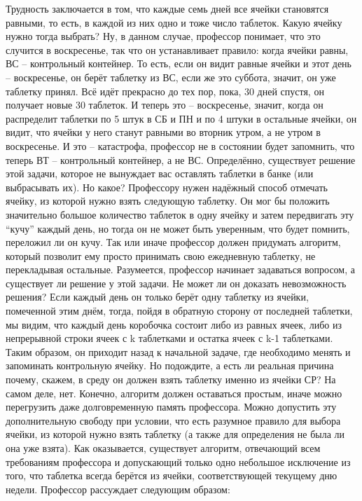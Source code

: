   Трудность заключается в том, что каждые семь дней все ячейки становятся равными, то есть, в каждой из них одно и тоже число таблеток. Какую ячейку нужно тогда выбрать?
Ну, в данном случае, профессор понимает, что это случится в воскресенье, так что он устанавливает правило: когда ячейки равны, ВС -- контрольный контейнер. То есть, если он видит равные ячейки и этот день -- воскресенье, он берёт таблетку из ВС, если же это суббота, значит, он уже таблетку принял.
  Всё идёт прекрасно до тех пор, пока, 30 дней спустя, он получает новые 30 таблеток.  И теперь это -- воскресенье, значит, когда он распределит таблетки по 5 штук в СБ и ПН и по 4 штуки в остальные ячейки, он видит, что ячейки у него станут равными во вторник утром, а не утром в воскресенье. И это -- катастрофа, профессор не в состоянии будет запомнить, что теперь ВТ -- контрольный контейнер, а не ВС.
  Определённо, существует решение этой задачи, которое не вынуждает вас оставлять таблетки в банке (или выбрасывать их). Но какое? Профессору нужен надёжный способ отмечать ячейку, из которой нужно взять следующую таблетку.  Он мог бы положить значительно большое количество таблеток в одну ячейку и затем передвигать эту “кучу” каждый день, но тогда он не может быть уверенным, что будет помнить, переложил ли он кучу. Так или иначе профессор должен придумать алгоритм, который позволит ему просто принимать свою ежедневную таблетку, не перекладывая остальные. 
    Разумеется, профессор начинает задаваться вопросом, а существует ли решение у этой задачи. Не может ли он доказать невозможность решения? Если каждый день он только берёт одну таблетку из ячейки, помеченной этим днём, тогда, пойдя в обратную сторону от последней таблетки, мы видим, что каждый день коробочка состоит либо из равных ячеек, либо из непрерывной строки ячеек  с k таблетками и остатка ячеек  с k-1 таблетками. Таким образом, он приходит назад к начальной задаче, где необходимо менять и запоминать контрольную ячейку.
  Но подождите, а есть ли реальная причина почему, скажем, в среду он должен взять таблетку именно из ячейки СР?  На самом деле, нет. Конечно, алгоритм должен оставаться простым, иначе можно перегрузить даже долговременную память профессора. 
Можно допустить эту дополнительную свободу  при условии, что есть разумное правило для выбора ячейки, из которой нужно взять таблетку (а также для определения не была ли она уже взята).
  Как оказывается,  существует алгоритм, отвечающий всем требованиям профессора и допускающий только одно небольшое исключение из того, что таблетка всегда берётся из ячейки, соответствующей текущему дню недели. Профессор рассуждает следующим образом:
 
